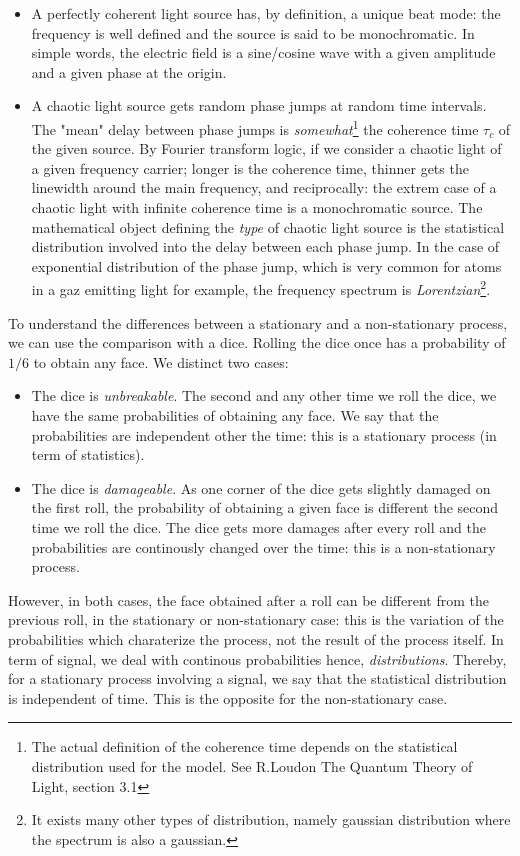\documentclass[12pt]{report}
\begin{document}
\begin{itemize}
	\item A perfectly coherent light source has, by definition, a unique beat mode: the frequency is well defined and the source is said to be monochromatic. In simple words, the electric field is a sine/cosine wave with a given amplitude and a given phase at the origin.
	\item A chaotic light source gets random phase jumps at random time intervals. The "mean" delay between phase jumps is \textit{somewhat}\footnote{The actual definition of the coherence time depends on the statistical distribution used for the model. See R.Loudon The Quantum Theory of Light, section 3.1} the coherence time $\tau_c$ of the given source. By Fourier transform logic, if we consider a chaotic light of a given frequency carrier; longer is the coherence time, thinner gets the linewidth around the main frequency, and reciprocally: the extrem case of a chaotic light with infinite coherence time is a monochromatic source. The mathematical object defining the \textit{type} of chaotic light source is the statistical distribution involved into the delay between each phase jump. In the case of exponential distribution of the phase jump, which is very common for atoms in a gaz emitting light for example, the frequency spectrum is \textit{Lorentzian}\footnote{It exists many other types of distribution, namely gaussian distribution where the spectrum is also a gaussian.}.
\end{itemize}

To understand the differences between a stationary and a non-stationary process, we can use the comparison with a dice. Rolling the dice once has a probability  of $1/6$ to obtain any face. We distinct two cases:
\begin{itemize}
	\item The dice is \textit{unbreakable}. The second and any other time we roll the dice, we have the same probabilities of obtaining any face. We say that the probabilities are independent other the time: this is a stationary process (in term of statistics).
	\item The dice is \textit{damageable}. As one corner of the dice gets slightly damaged on the first roll, the probability of obtaining a given face is different the second time we roll the dice. The dice gets more damages after every roll and the probabilities are continously changed over the time: this is a non-stationary process.
\end{itemize}
However, in both cases, the face obtained after a roll can be different from the previous roll, in the stationary or non-stationary case: this is the variation of the probabilities which charaterize the process, not the result of the process itself. In term of signal, we deal with continous probabilities hence, \textit{distributions}. Thereby, for a stationary process involving a signal, we say that the statistical distribution is independent of time. This is the opposite for the non-stationary case.
\end{document}
